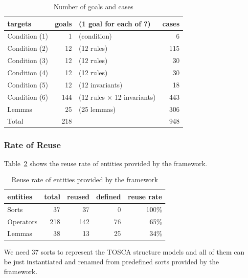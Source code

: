 \documentclass[12pt]{report}
\begin{document}
\begin{table}[hbtp]
  \caption{Number of goals and cases}
  \label{table:goalscases}
  \centering
  \begin{tabular}{lrlr}
    \hline
      targets & goals  & (1 goal for each of ?) & cases \\
    \hline \hline
    Condition (1)  & 1  & (condition) & 6 \\
    Condition (2)  & 12 & (12 rules) & 115  \\
    Condition (3)  & 12 & (12 rules) & 30 \\
    Condition (4)  & 12 & (12 rules) & 30 \\
    Condition (5)  & 12 & (12 invariants) & 18  \\
    Condition (6)  & 144 & (12 rules $\times$ 12 invariants) & 443  \\
    Lemmas  & 25 & (25 lemmas) & 306  \\
    \hline    \hline
    Total  & 218  & & 948 \\
    \hline
  \end{tabular}
\end{table}

\subsubsection{Rate of Reuse}
Table~\ref{table:reuse} shows the reuse rate of entities provided
by the framework.

\begin{table}[hbtp]
  \caption{Reuse rate of entities provided by the framework}
  \label{table:reuse}
  \centering
  \begin{tabular}{lrrrr}
    \hline
      entities & total  & reused & defined & reuse rate \\
    \hline \hline
    Sorts  & 37  & 37 & 0 & 100\% \\
    Operators  & 218 & 142 & 76 & 65\%  \\
    Lemmas  & 38 & 13 & 25 & 34\% \\
    \hline
  \end{tabular}
\end{table}

We need 37 sorts to represent the TOSCA structure models and all of
them can be just instantiated and renamed from predefined sorts
provided by the framework.
\end{document}
